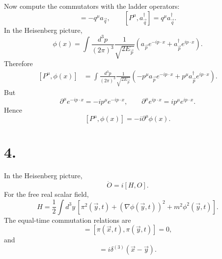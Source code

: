 \documentclass{article}
\begin{document}
Now compute the commutators with the ladder operators:
\begin{equation}
    [P^\mu,a_{\vec q}]
    =
    -q^\mu a_{\vec q},
    \qquad
    [P^\mu,a_{\vec q}^{\dagger}]
    =
    q^\mu a_{\vec q}^{\dagger}.
\end{equation}
In the Heisenberg picture,
\begin{equation}
    \phi(x)
    =
    \int\frac{d^3p}{(2\pi)^3}
    \frac{1}{\sqrt{2E_{\vec p}}}
    \left(
        a_{\vec p}e^{-ip\cdot x}
        +
        a_{\vec p}^{\dagger}e^{ip\cdot x}
    \right).
\end{equation}
Therefore
\begin{equation}
\begin{split}
    [P^\mu,\phi(x)]
    &=
    \int\frac{d^3p}{(2\pi)^3}
    \frac{1}{\sqrt{2E_{\vec p}}}
    \left(
        -p^\mu a_{\vec p}e^{-ip\cdot x}
        +
        p^\mu a_{\vec p}^{\dagger}e^{ip\cdot x}
    \right).
\end{split}
\end{equation}
But
\begin{equation}
    \partial^\mu e^{-ip\cdot x}
    =
    -ip^\mu e^{-ip\cdot x},
    \qquad
    \partial^\mu e^{ip\cdot x}
    =
    ip^\mu e^{ip\cdot x}.
\end{equation}
Hence
\begin{equation}
    \boxed{
    [P^\mu,\phi(x)]
    =
    -i\partial^\mu\phi(x)
    }.
\end{equation}


\section*{4.}

In the Heisenberg picture,
\begin{equation}
    \dot O=i[H,O].
\end{equation}
For the free real scalar field,
\begin{equation}
    H
    =
    \frac12\int d^3y\,
    \left[
        \pi^2(\vec y,t)
        +
        (\nabla\phi(\vec y,t))^2
        +
        m^2\phi^2(\vec y,t)
    \right].
\end{equation}
The equal-time commutation relations are
\begin{equation}
    [\phi(\vec x,t),\phi(\vec y,t)]
    =
    [\pi(\vec x,t),\pi(\vec y,t)]
    =
    0,
\end{equation}
and
\begin{equation}
    [\phi(\vec x,t),\pi(\vec y,t)]
    =
    i\delta^{(3)}(\vec x-\vec y).
\end{equation}
\end{document}

